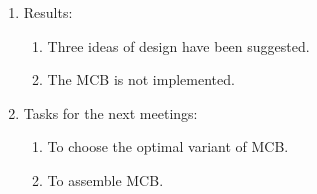 \begin{enumerate}
\begin{enumerate}
	\end{enumerate}
	
	\item Results:  
	\begin{enumerate}
		\item Three ideas of design have been suggested.
		
		\item The MCB is not implemented.
		
	\end{enumerate}
	
	\item Tasks for the next meetings:
	\begin{enumerate}
		\item To choose the optimal variant of MCB.
		
		\item To assemble MCB.
		
	\end{enumerate}     
\end{enumerate}
\fillpage

